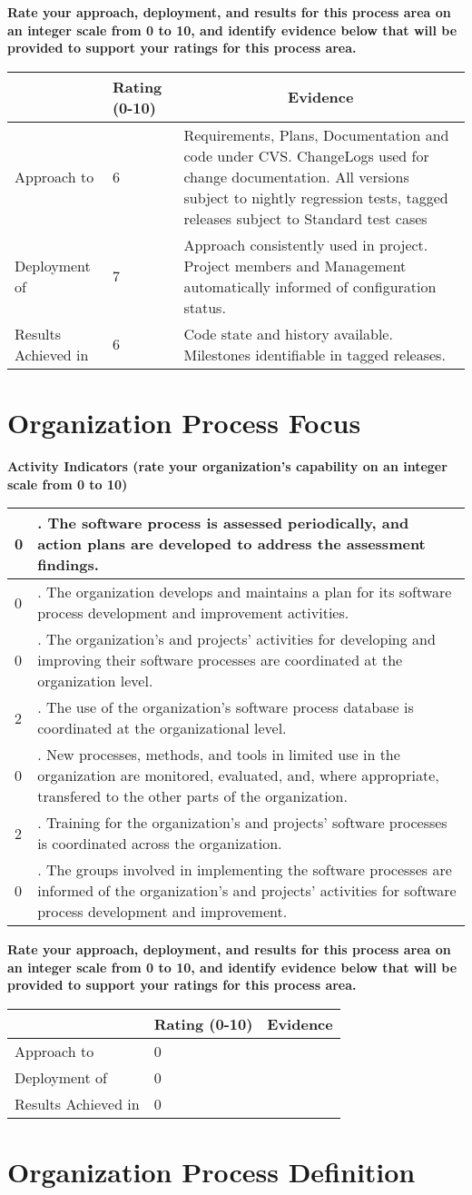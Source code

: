 \documentclass{article}
\newcommand{\KPAname}{}
\newenvironment{KPARate}[1]
	{\renewcommand{\KPAname}{#1}
	 {\bf Rate your approach, deployment, and results for
	  this process area on an integer scale from 0 to 10, and 
	  identify evidence below that will be provided to support your
	  ratings for this process area.}
	 \begin{center}
	 \begin{tabular}{|p{1.0in}|p{0.5in}|p{5.0in}|} \hline
	 & Rating (0-10) & \multicolumn{1}{c|}{Evidence} \\ \hline}
	{\end{tabular}
	 \end{center}}
\newcommand{\Approach}[2]{Approach to \KPAname & #1 & #2 \\ \hline}
\newcommand{\Deployment}[2]{Deployment of \KPAname & #1 & #2 \\ \hline}
\newcommand{\Results}[2]{Results Achieved in \KPAname & #1 & #2 \\
	\hline}
\newcounter{activity}
\newenvironment{KPAActivity}
	{
	 \setcounter{activity}{0}
	 {\bf Activity Indicators (rate your organization's capability
	 on an integer scale from 0 to 10)}
	 \begin{center}
	 \begin{tabular}{|p{0.5in}|p{6.0in}|} \hline
	}
	{
	 \end{tabular}
	 \end{center}
	}
\newcommand{\Activity}[2]{\stepcounter{activity} #1 &
\arabic{activity}. #2 \\ \hline}
\begin{document}
\begin{KPARate}{Software Configuration Management}
\Approach{6}{Requirements, Plans, Documentation and code under CVS.
             ChangeLogs used for change documentation.  All versions
             subject to nightly regression tests, tagged
             releases subject to Standard test cases}
\Deployment{7}{Approach consistently used in project. Project members
             and Management automatically informed of configuration
             status.}
\Results{6}{Code state and history available.  Milestones identifiable
            in tagged releases.}
\end{KPARate}

\newpage
\section{Organization Process Focus}

\begin{KPAActivity}
\Activity{0}{The software process is assessed periodically, and action
plans are developed to address the assessment findings.}
\Activity{0}{The organization develops and maintains a plan for its
software process development and improvement activities.}
\Activity{0}{The organization's and projects' activities for
developing and improving their software processes are coordinated at
the organization level.}
\Activity{2}{The use of the organization's software process
database is coordinated at the organizational level.}
\Activity{0}{New processes, methods, and tools in limited use in
the organization are monitored, evaluated, and, where appropriate,
transfered to the other parts of the organization.}
\Activity{2}{Training for the organization's and projects' software
processes is coordinated across the organization.}
\Activity{0}{The groups involved in implementing the software
processes are informed of the organization's and projects' activities
for software process development and improvement.}
\end{KPAActivity}

\begin{KPARate}{Organization Process Focus}
\Approach{0}{}
\Deployment{0}{}
\Results{0}{}
\end{KPARate}

\newpage
\section{Organization Process Definition}
\end{document}
